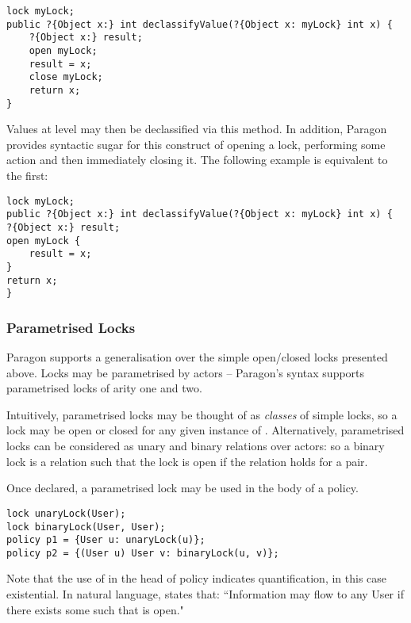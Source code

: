 \begin{verbatim}
lock myLock;
public ?{Object x:} int declassifyValue(?{Object x: myLock} int x) {
	?{Object x:} result;
	open myLock;
	result = x;
	close myLock;
	return x;
}
\end{verbatim}

Values at level  may then be declassified via this method. In addition, Paragon provides syntactic sugar for this construct of opening a lock, performing some action and then immediately closing it. The following example is equivalent to the first:

\begin{verbatim}
lock myLock;
public ?{Object x:} int declassifyValue(?{Object x: myLock} int x) {
?{Object x:} result;
open myLock {
	result = x;
}
return x;
}
\end{verbatim}

\newpage

\subsubsection{Parametrised Locks}

Paragon supports a generalisation over the simple open/closed locks presented above. Locks may be parametrised by actors -- Paragon's syntax supports parametrised locks of arity one and two.

Intuitively, parametrised locks may be thought of as \textit{classes} of simple locks, so a lock  may be open or closed for any given instance of . Alternatively, parametrised locks can be considered as unary and binary relations over actors: so a binary lock  is a relation such that the lock is open if the relation holds for a  pair.

Once declared, a parametrised lock may be used in the body of a policy.

\begin{verbatim}
lock unaryLock(User);
lock binaryLock(User, User);
policy p1 = {User u: unaryLock(u)};
policy p2 = {(User u) User v: binaryLock(u, v)};
\end{verbatim}

Note that the use of  in the head of policy  indicates quantification, in this case existential. In natural language,  states that: ``Information may flow to any User  if there exists some  such that  is open."

